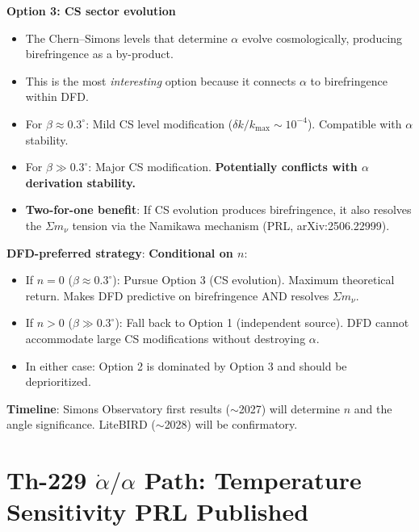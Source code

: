 \documentclass[11pt,a4paper]{article}
\newcommand{\NEW}{\textcolor{dfdblue}{\textbf{NEW}}}
\begin{document}
\begin{tcolorbox}[colback=yellow!5!white, colframe=yellow!60!black,
  title={\NEW: i48 Birefringence Accommodation Analysis --- Which Option for DFD?}]
\medskip
\textbf{Option 3: CS sector evolution}
\begin{itemize}
\item The Chern--Simons levels that determine $\alpha$ evolve cosmologically, producing birefringence as a by-product.
\item This is the most \emph{interesting} option because it connects $\alpha$ to birefringence within DFD.
\item For $\beta \approx 0.3^\circ$: Mild CS level modification ($\delta k / k_{\max} \sim 10^{-4}$). Compatible with $\alpha$ stability.
\item For $\beta \gg 0.3^\circ$: Major CS modification. \textbf{Potentially conflicts with $\alpha$ derivation stability.}
\item \textbf{Two-for-one benefit}: If CS evolution produces birefringence, it also resolves the $\Sigma m_\nu$ tension via the Namikawa mechanism (PRL, arXiv:2506.22999).
\end{itemize}

\medskip
\textbf{DFD-preferred strategy}: \textbf{Conditional on $n$}:
\begin{itemize}
\item If $n = 0$ ($\beta \approx 0.3^\circ$): Pursue Option 3 (CS evolution). Maximum theoretical return. Makes DFD predictive on birefringence AND resolves $\Sigma m_\nu$.
\item If $n > 0$ ($\beta \gg 0.3^\circ$): Fall back to Option 1 (independent source). DFD cannot accommodate large CS modifications without destroying $\alpha$.
\item In either case: Option 2 is dominated by Option 3 and should be deprioritized.
\end{itemize}

\textbf{Timeline}: Simons Observatory first results ($\sim$2027) will determine $n$ and the angle significance. LiteBIRD ($\sim$2028) will be confirmatory.
\end{tcolorbox}

\section{Th-229 $\dot{\alpha}/\alpha$ Path: Temperature Sensitivity PRL Published}
\end{document}
